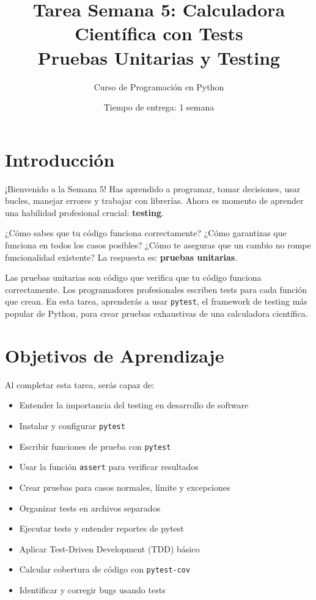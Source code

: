 \documentclass[12pt,a4paper]{article}
\title{\textbf{Tarea Semana 5: Calculadora Científica con Tests}\\
\large Pruebas Unitarias y Testing}
\author{Curso de Programación en Python}
\date{Tiempo de entrega: 1 semana}
\begin{document}
\maketitle

\section{Introducción}

¡Bienvenido a la Semana 5! Has aprendido a programar, tomar decisiones, usar bucles, manejar errores y trabajar con librerías. Ahora es momento de aprender una habilidad profesional crucial: \textbf{testing}.

¿Cómo sabes que tu código funciona correctamente? ¿Cómo garantizas que funciona en todos los casos posibles? ¿Cómo te aseguras que un cambio no rompe funcionalidad existente? La respuesta es: \textbf{pruebas unitarias}.

Las pruebas unitarias son código que verifica que tu código funciona correctamente. Los programadores profesionales escriben tests para cada función que crean. En esta tarea, aprenderás a usar \texttt{pytest}, el framework de testing más popular de Python, para crear pruebas exhaustivas de una calculadora científica.

\section{Objetivos de Aprendizaje}

Al completar esta tarea, serás capaz de:

\begin{itemize}[leftmargin=*]
    \item Entender la importancia del testing en desarrollo de software
    \item Instalar y configurar \texttt{pytest}
    \item Escribir funciones de prueba con \texttt{pytest}
    \item Usar la función \texttt{assert} para verificar resultados
    \item Crear pruebas para casos normales, límite y excepciones
    \item Organizar tests en archivos separados
    \item Ejecutar tests y entender reportes de pytest
    \item Aplicar Test-Driven Development (TDD) básico
    \item Calcular cobertura de código con \texttt{pytest-cov}
    \item Identificar y corregir bugs usando tests
\end{itemize}
\end{document}
